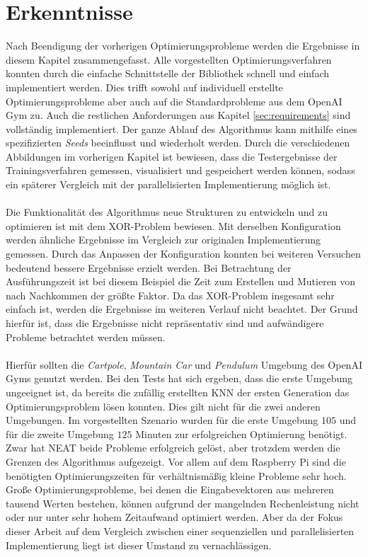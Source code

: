 \section{Erkenntnisse}
\label{sec:analysis_results}
Nach Beendigung der vorherigen Optimierungsprobleme werden die Ergebnisse in diesem Kapitel zusammengefasst. Alle vorgestellten Optimierungsverfahren konnten durch die einfache Schnittstelle der Bibliothek schnell und einfach implementiert werden. Dies trifft sowohl auf individuell erstellte Optimierungsprobleme aber auch auf die Standardprobleme aus dem OpenAI Gym zu. Auch die restlichen Anforderungen aus Kapitel \ref{sec:requirements} sind vollständig implementiert. Der ganze Ablauf des Algorithmus kann mithilfe eines spezifizierten \emph{Seeds} beeinflusst und wiederholt werden. Durch die verschiedenen Abbildungen im vorherigen Kapitel ist bewiesen, dass die Testergebnisse der Trainingsverfahren gemessen, visualisiert und gespeichert werden können, sodass ein späterer Vergleich mit der parallelisierten Implementierung möglich ist.
\\\\
Die Funktionalität des Algorithmus neue Strukturen zu entwickeln und zu optimieren ist mit dem XOR-Problem bewiesen. Mit derselben Konfiguration werden ähnliche Ergebnisse im Vergleich zur originalen Implementierung gemessen. Durch das Anpassen der Konfiguration konnten bei weiteren Versuchen bedeutend bessere Ergebnisse erzielt werden. Bei Betrachtung der Ausführungszeit ist bei diesem Beispiel die Zeit zum Erstellen und Mutieren von nach Nachkommen der größte Faktor. Da das XOR-Problem insgesamt sehr einfach ist, werden die Ergebnisse im weiteren Verlauf nicht beachtet. Der Grund hierfür ist, dass die Ergebnisse nicht repräsentativ sind und aufwändigere Probleme betrachtet werden müssen.
\\\\
Hierfür sollten die \emph{Cartpole}, \emph{Mountain Car} und \emph{Pendulum} Umgebung des OpenAI Gyms genutzt werden. Bei den Tests hat sich ergeben, dass die erste Umgebung ungeeignet ist, da bereits die zufällig erstellten \ac{KNN} der ersten Generation das Optimierungsproblem lösen konnten. Dies gilt nicht für die zwei anderen Umgebungen. Im vorgestellten Szenario wurden für die erste Umgebung $105$ und für die zweite Umgebung $125$ Minuten zur erfolgreichen Optimierung benötigt. Zwar hat \ac{NEAT} beide Probleme erfolgreich gelöst, aber trotzdem werden die Grenzen des Algorithmus aufgezeigt. Vor allem auf dem Raspberry Pi sind die benötigten Optimierungszeiten für verhältnismäßig kleine Probleme sehr hoch. Große Optimierungsprobleme, bei denen die Eingabevektoren aus mehreren tausend Werten bestehen, können aufgrund der mangelnden Rechenleistung nicht oder nur unter sehr hohem Zeitaufwand optimiert werden. Aber da der Fokus dieser Arbeit auf dem Vergleich zwischen einer sequenziellen und parallelisierten Implementierung liegt ist dieser Umstand zu vernachlässigen.
